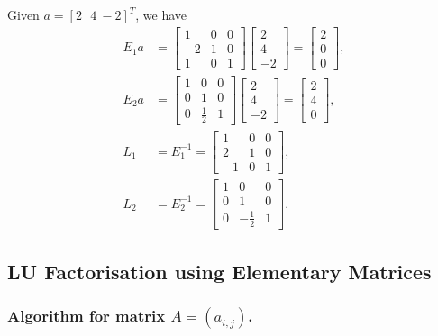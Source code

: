 \documentclass[11pt]{article}
\begin{document}
Given \(a = [ 2 \ \ \ 4 \ -\!2]^T\), we have \[\begin{aligned}
E_1 a &= \left[\begin{array}{rrr}
1&0&0\\
-2&1&0\\
1&0&1
\end{array}\right] \left[\begin{array}{r}2\\4\\-2\end{array}\right]
=\left[\begin{array}{r}2\\0\\0\end{array}\right], \\
E_2 a &= \left[\begin{array}{rrr}
1&0&0\\
0&1&0\\
0&\frac{1}{2}&1
\end{array}\right]\left[\begin{array}{r}2\\4\\-2\end{array}\right]
=\left[\begin{array}{r}2\\4\\0\end{array}\right], \\
L_1 &=E_1^{-1}=\left[\begin{array}{rrr}
1&0&0\\
2&1&0\\
-1&0&1
\end{array}\right],\\
L_2 &=E_2^{-1}=\left[\begin{array}{rrr}
1&0&0\\
0&1&0\\
0&-\frac{1}{2}&1
\end{array}\right] .\end{aligned}\]

    \subsection{LU Factorisation using Elementary
Matrices}\label{lu-factorisation-using-elementary-matrices}

\subsubsection{\texorpdfstring{Algorithm for matrix
\(A =(a_{i,j})\).}{Algorithm for matrix A =(a\_\{i,j\}).}}\label{algorithm-for-matrix-a-a_ij.}
\end{document}
